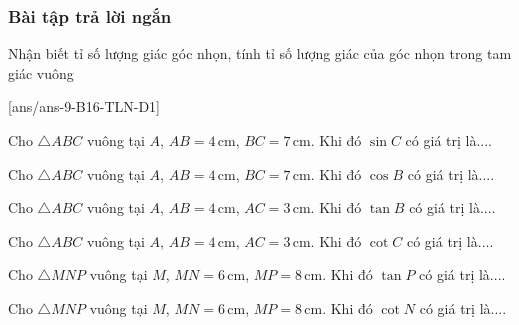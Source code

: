 \subsubsection{Bài tập trả lời ngắn}
\begin{dang}{Nhận biết tỉ số lượng giác góc nhọn, tính tỉ số lượng giác của góc nhọn trong tam giác vuông}
\end{dang}
[ans/ans-9-B16-TLN-D1]
\begin{ex}%
	Cho $\triangle ABC$ vuông tại $A$, $AB=4\,\text{cm}$, $BC=7\,\text{cm}$. Khi đó $\sin C$ có giá trị là....
\end{ex}
\begin{ex}%
	Cho $\triangle ABC$ vuông tại $A$, $AB=4\,\text{cm}$, $BC=7\,\text{cm}$. Khi đó $\cos B$ có giá trị là....
\end{ex}
\begin{ex}%
	Cho $\triangle ABC$ vuông tại $A$, $AB=4\,\text{cm}$, $AC=3\,\text{cm}$. Khi đó $\tan B$ có giá trị là....
\end{ex}
\begin{ex}%
	Cho $\triangle ABC$ vuông tại $A$, $AB=4\,\text{cm}$, $AC=3\,\text{cm}$. Khi đó $\cot C$ có giá trị là....
\end{ex}
\begin{ex}%
	Cho $\triangle MNP$ vuông tại $M$, $MN=6\,\text{cm}$, $MP=8\,\text{cm}$. Khi đó $\tan P$ có giá trị là....
\end{ex}
\begin{ex}%
	Cho $\triangle MNP$ vuông tại $M$, $MN=6\,\text{cm}$, $MP=8\,\text{cm}$. Khi đó $\cot N$ có giá trị là....
\end{ex}
